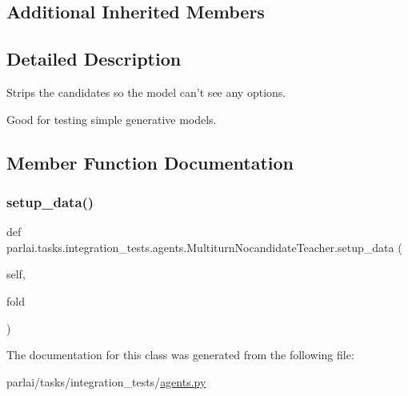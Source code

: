 \subsection*{Additional Inherited Members}


\subsection{Detailed Description}
\begin{DoxyVerb}Strips the candidates so the model can't see any options.

Good for testing simple generative models.
\end{DoxyVerb}
 

\subsection{Member Function Documentation}
\mbox{\label{classparlai_1_1tasks_1_1integration__tests_1_1agents_1_1MultiturnNocandidateTeacher_ac786d0ae36e1d445d68a076b8d1b8391}} 
\subsubsection{\texorpdfstring{setup\+\_\+data()}{setup\_data()}}
{\footnotesize\ttfamily def parlai.\+tasks.\+integration\+\_\+tests.\+agents.\+Multiturn\+Nocandidate\+Teacher.\+setup\+\_\+data (\begin{DoxyParamCaption}\item[{}]{self,  }\item[{}]{fold }\end{DoxyParamCaption})}



The documentation for this class was generated from the following file\+:\begin{DoxyCompactItemize}
\item 
parlai/tasks/integration\+\_\+tests/\hyperlink{parlai_2tasks_2integration__tests_2agents_8py}{agents.\+py}\end{DoxyCompactItemize}
